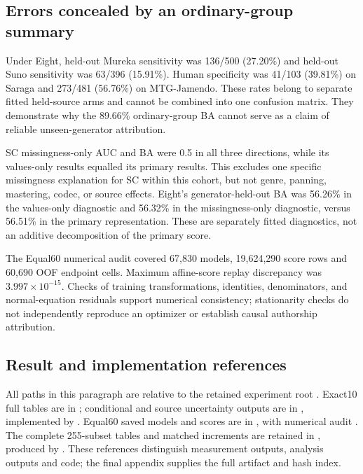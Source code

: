 \subsection{Errors concealed by an ordinary-group summary}

Under Eight, held-out Mureka sensitivity was 136/500 (27.20\%) and held-out
Suno sensitivity was 63/396 (15.91\%). Human specificity was 41/103 (39.81\%)
on Saraga and 273/481 (56.76\%) on MTG-Jamendo. These rates belong to separate
fitted held-source arms and cannot be combined into one confusion matrix.
They demonstrate why the 89.66\% ordinary-group BA cannot serve as a claim of
reliable unseen-generator attribution.

SC missingness-only AUC and BA were 0.5 in all three directions, while its
values-only results equalled its primary results. This excludes one specific
missingness explanation for SC within this cohort, but not genre, panning,
mastering, codec, or source effects. Eight's generator-held-out BA was 56.26\%
in the values-only diagnostic and 56.32\% in the missingness-only diagnostic,
versus 56.51\% in the primary representation. These are separately fitted
diagnostics, not an additive decomposition of the primary score.

The Equal60 numerical audit covered 67,830 models, 19,624,290 score rows and
60,690 OOF endpoint cells. Maximum affine-score replay discrepancy was
$3.997\times10^{-15}$. Checks of training transformations, identities,
denominators, and normal-equation residuals support numerical consistency;
stationarity checks do not independently reproduce an optimizer or establish
causal authorship attribution.

\subsection{Result and implementation references}

\begingroup\raggedright
All paths in this paragraph are relative to the retained experiment root
.
Exact10 full tables are in ;
conditional and source uncertainty outputs are in
, implemented by
.
Equal60 saved models and scores are in
, with numerical audit
.
The complete 255-subset tables and matched increments are retained in
, produced by
.
These references distinguish measurement outputs, analysis outputs and code;
the final appendix supplies the full artifact and hash index.
\par\endgroup
